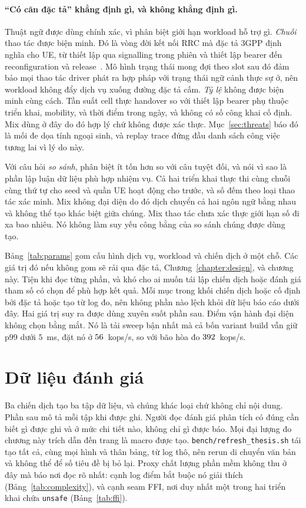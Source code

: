 \paragraph{``Có căn đặc tả'' khẳng định gì, và không khẳng định gì.}
Thuật ngữ được dùng chính xác, vì phân biệt giới hạn workload hỗ trợ gì. \emph{Chuỗi}
thao tác được biện minh. Đó là vòng đời kết nối RRC mà đặc tả 3GPP
định nghĩa cho UE, từ thiết lập qua signalling trong phiên và thiết lập bearer
đến reconfiguration và release~\cite{3gpp38401,3gpp38331}. Mô hình trạng thái mong đợi theo slot sau đó
đảm bảo mọi thao tác driver phát ra hợp pháp với trạng thái ngữ cảnh thực sự ở,
nên workload không đẩy dịch vụ xuống đường đặc tả cấm. \emph{Tỷ lệ}
không được biện minh cùng cách. Tần suất cell thực handover so với
thiết lập bearer phụ thuộc triển khai, mobility, và thời điểm trong ngày, và không
có số công khai cố định. Mix dùng ở đây do đó hợp lý chứ không được xác thực.
Mục~\ref{sec:threats} báo đó là mối đe dọa tính ngoại sinh, và replay trace đứng đầu
danh sách công việc tương lai vì lý do này.

Với câu hỏi \emph{so sánh}, phân biệt ít tốn hơn so với câu tuyệt đối,
và nói vì sao là phần lập luận dữ liệu phù hợp nhiệm vụ. Cả hai triển khai thực thi
cùng chuỗi cùng thứ tự cho seed và quần UE hoạt động cho trước, và
số đếm theo loại thao tác xác minh. Mix không đại diện do đó dịch chuyển cả hai ngôn ngữ
bằng nhau và không thể tạo khác biệt giữa chúng. Mix thao tác chưa xác thực giới hạn số
đi xa bao nhiêu. Nó không làm suy yếu công bằng của so sánh chúng được dùng tạo.

Bảng~\ref{tab:params} gom cấu hình dịch vụ, workload và chiến dịch ở
một chỗ. Các giá trị đó nếu không gom sẽ rải qua đặc tả,
Chương~\ref{chapter:design}, và chương này. Tiện khi đọc từng phần, và
khó cho ai muốn tái lập chiến dịch hoặc đánh giá tham số có chọn để
phù hợp kết quả. Mỗi mục trong khối chiến dịch hoặc cố định bởi đặc tả hoặc
tạo từ log đo, nên không phần nào lệch khỏi dữ liệu báo cáo
dưới đây. Hai giá trị suy ra được dùng xuyên suốt phần sau. Điểm vận hành đại diện
không chọn bằng mắt. Nó là tải sweep bận nhất mà cả bốn variant build vẫn giữ
p99 dưới $5$~ms, đặt nó ở $56$~kops/s, so với bão hòa đo
$392$~kops/s.

\section{Dữ liệu đánh giá}
Ba chiến dịch tạo ba tập dữ liệu, và chúng khác loại chứ không chỉ nội dung. Phần
sau mô tả mỗi tập khi được ghi. Người đọc đánh giá phân tích có đúng cần
biết gì được ghi và ở mức chi tiết nào, không chỉ gì được báo. Mọi đại lượng đo
chương này trích dẫn đến trang là macro được tạo.
\texttt{bench/refresh\_thesis.sh} tái tạo tất cả, cùng mọi hình và thân bảng,
từ log thô, nên rerun di chuyển văn bản và không thể để số tiêu đề
bị bỏ lại. Proxy chất lượng
phần mềm không thu ở đây mà báo nơi đọc rõ nhất: cạnh log điểm bắt buộc nó giải thích (Bảng~\ref{tab:complexity}), và cạnh seam FFI, nơi duy nhất
một trong hai triển khai chứa \texttt{unsafe} (Bảng~\ref{tab:ffi}).

